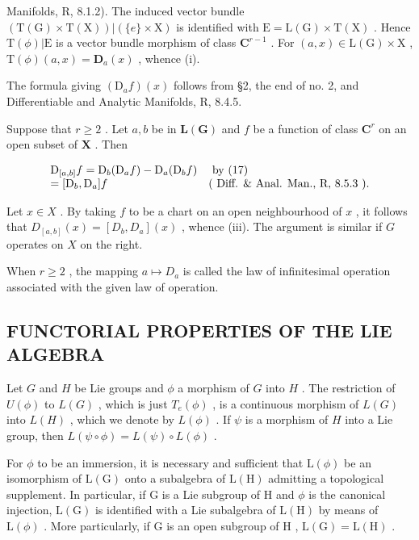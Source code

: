Manifolds, R, 8.1.2). The induced vector bundle \((\mathrm{T}(\mathrm{G}) \times \mathrm{T}(\mathrm{X}))|(\{e\} \times \mathrm{X})\) is identified with \(\mathrm{E} = \mathrm{L}(\mathrm{G}) \times \mathrm{T}(\mathrm{X})\) . Hence \(\mathrm{T}(\phi)|\mathrm{E}\) is a vector bundle morphism of class \(\mathbf{C}^{r-1}\) . For \((a, x) \in \mathrm{L}(\mathrm{G}) \times \mathrm{X}\) , \(\mathrm{T}(\phi)(a, x) = \mathbf{D}_{a}(x)\) , whence (i).

The formula giving \((\mathrm{D}_a f)(x)\) follows from §2, the end of no. 2, and Differentiable and Analytic Manifolds, R, 8.4.5.

Suppose that \(r \geqslant 2\) . Let \(a, b\) be in \(\mathbf{L}(\mathbf{G})\) and \(f\) be a function of class \(\mathbf{C}^r\) on an open subset of \(\mathbf{X}\) . Then

\[
\begin{array}{l l} \mathrm{D} _ {[ a, b ]} f = \mathrm{D} _ {b} (\mathrm{D} _ {a} f) - \mathrm{D} _ {a} (\mathrm{D} _ {b} f) & \text { by   (17) } \\ = [ \mathrm{D} _ {b}, \mathrm{D} _ {a} ] f & (\text { Diff.   \&   Anal.   Man.,   R,   8.5.3 }). \end{array}
\]

Let \(x \in X\) . By taking \(f\) to be a chart on an open neighbourhood of \(x\) , it follows that \(D_{[a,b]}(x) = [D_b, D_a](x)\) , whence (iii). The argument is similar if \(G\) operates on \(X\) on the right.

When \(r \geqslant 2\) , the mapping \(a \mapsto D_{a}\) is called the law of infinitesimal operation associated with the given law of operation.

\subsection{FUNCTORIAL PROPERTIES OF THE LIE ALGEBRA}

Let \(G\) and \(H\) be Lie groups and \(\phi\) a morphism of \(G\) into \(H\) . The restriction of \(U(\phi)\) to \(L(G)\) , which is just \(T_e(\phi)\) , is a continuous morphism of \(L(G)\) into \(L(H)\) , which we denote by \(L(\phi)\) . If \(\psi\) is a morphism of \(H\) into a Lie group, then \(L(\psi \circ \phi) = L(\psi) \circ L(\phi)\) .

For \(\phi\) to be an immersion, it is necessary and sufficient that \(\mathrm{L}(\phi)\) be an isomorphism of \(\mathrm{L}(\mathrm{G})\) onto a subalgebra of \(\mathrm{L}(\mathrm{H})\) admitting a topological supplement. In particular, if \(\mathrm{G}\) is a Lie subgroup of \(\mathrm{H}\) and \(\phi\) is the canonical injection, \(\mathrm{L}(\mathrm{G})\) is identified with a Lie subalgebra of \(\mathrm{L}(\mathrm{H})\) by means of \(\mathrm{L}(\phi)\) . More particularly, if \(\mathrm{G}\) is an open subgroup of \(\mathrm{H}\) , \(\mathrm{L}(\mathrm{G}) = \mathrm{L}(\mathrm{H})\) .

